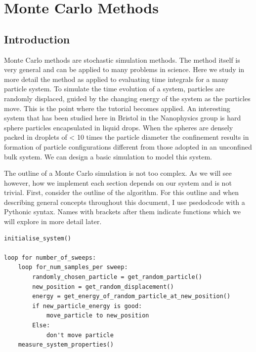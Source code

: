 \section{Monte Carlo Methods}
	\subsection{Introduction}
		Monte Carlo methods are stochastic simulation methods. The method itself is very general and can be applied to many problems in science. Here we study in more detail the method as applied to evaluating time integrals for a many particle system. To simulate the time evolution of a system, particles are randomly displaced, guided by the changing energy of the system as the particles move. This is the point where the tutorial becomes applied. An interesting system that has been studied here in Bristol in the Nanophysics group is hard sphere particles encapsulated in liquid drops. When the spheres are densely packed in droplets of < 10 times the particle diameter the confinement results in formation of particle configurations different from those adopted in an unconfined bulk system. We can design a basic simulation to model this system.

		The outline of a Monte Carlo simulation is not too complex. As we will see however, how we implement each section depends on our system and is not trivial. First, consider the outline of the algorithm. For this outline and when describing general concepts throughout this document, I use psedodcode with a Pythonic syntax. Names with brackets after them indicate functions which we will explore in more detail later.
	\begin{lstlisting}
initialise_system()

loop for number_of_sweeps:
	loop for_num_samples_per sweep:
		randomly_chosen_particle = get_random_particle()
		new_position = get_random_displacement()
		energy = get_energy_of_random_particle_at_new_position()
		if new_particle_energy is good:
			move_particle to new_position
		Else:
			don't move particle
	measure_system_properties()\end{lstlisting}


